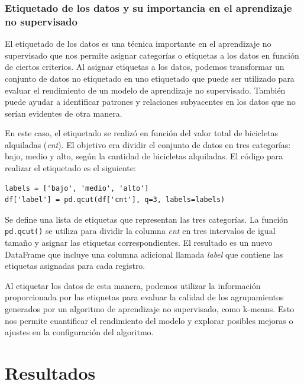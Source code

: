 \documentclass{wsdcr}
\begin{document}
\subsubsection{Etiquetado de los datos y su importancia en el aprendizaje no supervisado}

El etiquetado de los datos es una técnica importante en el aprendizaje no supervisado que nos permite asignar categorías o etiquetas a los datos en función de ciertos criterios. Al asignar etiquetas a los datos, podemos transformar un conjunto de datos no etiquetado en uno etiquetado que puede ser utilizado para evaluar el rendimiento de un modelo de aprendizaje no supervisado. También puede ayudar a identificar patrones y relaciones subyacentes en los datos que no serían evidentes de otra manera.

En este caso, el etiquetado se realizó en función del valor total de bicicletas alquiladas (\textit{cnt}). El objetivo era dividir el conjunto de datos en tres categorías: bajo, medio y alto, según la cantidad de bicicletas alquiladas. El código para realizar el etiquetado es el siguiente:

{\fontsize{7pt}{12pt}\selectfont %
\begin{verbatim}
labels = ['bajo', 'medio', 'alto']
df['label'] = pd.qcut(df['cnt'], q=3, labels=labels)
\end{verbatim}
}

Se define una lista de etiquetas que representan las tres categorías. La función \texttt{pd.qcut()} se utiliza para dividir la columna \textit{cnt} en tres intervalos de igual tamaño y asignar las etiquetas correspondientes. El resultado es un nuevo DataFrame que incluye una columna adicional llamada \textit{label} que contiene las etiquetas asignadas para cada registro.

Al etiquetar los datos de esta manera, podemos utilizar la información proporcionada por las etiquetas para evaluar la calidad de los agrupamientos generados por un algoritmo de aprendizaje no supervisado, como k-means. Esto nos permite cuantificar el rendimiento del modelo y explorar posibles mejoras o ajustes en la configuración del algoritmo.

\section{Resultados}
\end{document}
